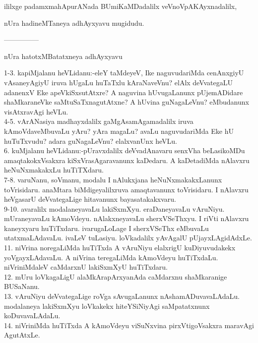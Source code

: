 \documentclass{article}
\begin{document}
\begin{center}
ililxge padamxmahApurANada BUmiKaMDadalilx veVnoVpAKAyxnadalilx,
\end{center}

\begin{center}
nUra hadineMTaneya adhAyxyavu mugidudu.
\end{center}

\begin{center}
---------------
\end{center}

\begin{center}
nUra hatotxMBatatxneya adhAyxyavu
\end{center}

1-3. kapiMjalanu heVLidanu:-eleY taMdeyeV, Ike naguvudariMda cenAnxgiyU vAsaneyAgiyU iruva hUgaLu huTaTxlu kAraNaveVnu? elAlx deVvategaLU adanenxV Eke apeVkiSxsutAtxre? A naguvina hUvugaLanunx pUjemADidare shaMkaraneVke saMtuSaTxnagutAtxne? A hUvina guNagaLeVnu? eMbudanunx visAtxravAgi heVLu.\\
4-5. vArANasiya madhayxdalilx gaMgAsamAgamadalilx iruva kAmoVdaveMbuvaLu yAru? yAra magaLu? avaLu naguvudariMda Eke hU huTuTxvudu? adara guNagaLeVnu? elalxvanUnx heVLu.\\
6. kuMjalanu heVLidanu:-pUravxdalilx deVvadAnavaru senxVha beLasikoMDu amaqtakokxVsakxra kiSxVrasAgaravanunx kaDedaru. A kaDetadiMda nAlavxru heNuNxmakakxLu huTiTXdaru.\\
7-8. varuNanu, soVmanu, modalu I nAlukxjana heNuNxmakakxLanunx toVrisidaru. anaMtara biMdigeyalilxruva amaqtavanunx toVrisidaru. I nAlavxru heVgasarU deVvategaLige hitavanunx bayasatakakxvaru.\\
9-10. avaralilx modalaneyavaLu lakiSxmXyu. eraDaneyavaLu vAruNiyu. mUraneyavaLu kAmoVdeyu. nAlakxneyavaLu sherxVSeThxyu. I riVti nAlavxru kaneyxyaru huTiTxdaru. ivarugaLoLage I sherxVSeThx eMbuvaLu utatxmaLAdavaLu. ivaLeV tuLasiyu. loVkadalilx yAvAgalU pUjayxLAgidAdxLe.\\
11. niVrina noregaLiMda huTiTxda A vAruNiyu elalxrigU kuDiyuvudakekx yoVgayxLAdavaLu. A niVrina teregaLiMda kAmoVdeyu huTiTxdaLu. niVriniMdaleV caMdarxnU lakiSxmXyU huTiTxdaru.\\
12. mUru loVkagaLigU alaMkArapArxyanAda caMdarxnu shaMkaranige BUSaNanu.\\
13. vAruNiyu deVvategaLige roVga sAvugaLanunx nAshamADuvavaLAdaLu. modalaneya lakiSxmXyu loVkakekx hiteYSiNiyAgi saMpatatxnunx koDuvavaLAdaLu.\\
14. niVriniMda huTiTxda A kAmoVdeyu viSuNxvina pirxVtigoVsakxra maravAgi AgutAtxLe.\\
\end{document}

